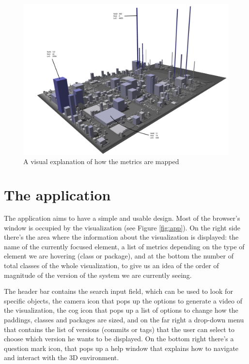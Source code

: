 \documentclass[]{usiinfbachelorproject}
\begin{document}
\begin{figure} [H]
\centering
\includegraphics[width=1\textwidth]{pictures/metrics.png}
\caption{A visual explanation of how the metrics are mapped}
\label{fig:metrics}
\end{figure}



\section{The application} \label{WebCity}

The application aims to have a simple and usable design. Most of the browser's window is occupied by the visualization (see Figure \ref{fig:app}). On the right side there's the area where the information about the visualization is displayed: the name of the currently focused element, a list of metrics depending on the type of element we are hovering (class or package),
and at the bottom the number of total classes of the whole visualization, to give us an idea of the order of magnitude of the version of the system we are currently seeing.

The header bar contains the search input field, which can be used to look for specific objects, the camera icon that pops up the options to generate a video of the visualization, the cog icon that pops up a list of options to change how the paddings, classes and packages are sized, and on the far right a drop-down menu that contains the list of versions (commits or tags) that the user can select to choose which version he wants to be displayed.
On the bottom right there's a question mark icon, that pops up a help window that explains how to navigate and interact with the 3D environment.
\end{document}
